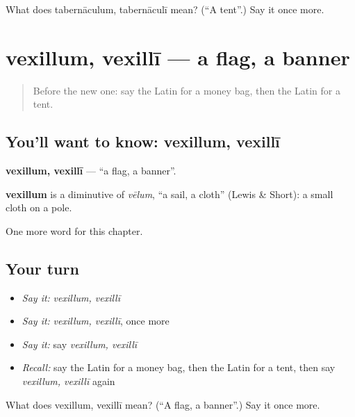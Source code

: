 \begin{tcolorbox}[breakable,colback=teal!4,colframe=teal!35!black,title={Before you move on}]
What does tabernāculum, tabernāculī mean? (\textquotedblleft{}A tent\textquotedblright{}.) Say it once more.
\end{tcolorbox}
\section[vexillum, vexillī]{vexillum, vexillī — a flag, a banner}

\label{lesson:LA-C254-vexillum}



\begin{quote}
Before the new one: say the Latin for a money bag, then the Latin for a tent.
\end{quote}

\subsection*{You'll want to know: vexillum, vexillī}
\textbf{vexillum, vexillī} — \textquotedblleft{}a flag, a banner\textquotedblright{}.

\begin{cousinweb}
\textbf{vexillum} is a diminutive of \emph{vēlum}, \textquotedblleft{}a sail, a cloth\textquotedblright{} (Lewis \& Short): a small cloth on a pole.
\end{cousinweb}

\begin{grammarlens}[title={What you've built}]
One more word for this chapter.
\end{grammarlens}

\subsection*{Your turn}
\begin{itemize}
\raggedright
  \item \emph{Say it:} \emph{vexillum, vexillī}
  \item \emph{Say it:} \emph{vexillum, vexillī}, once more
  \item \emph{Say it:} say \emph{vexillum, vexillī}
  \item \emph{Recall:} say the Latin for a money bag, then the Latin for a tent, then say \emph{vexillum, vexillī} again
\end{itemize}

\begin{tcolorbox}[breakable,colback=teal!4,colframe=teal!35!black,title={Before you move on}]
What does vexillum, vexillī mean? (\textquotedblleft{}A flag, a banner\textquotedblright{}.) Say it once more.
\end{tcolorbox}
